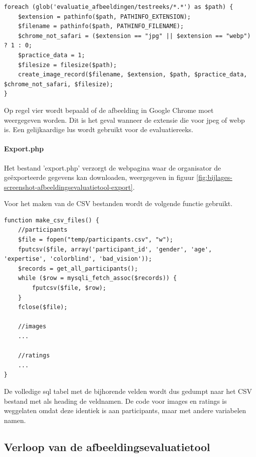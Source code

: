 \begin{lstlisting}
foreach (glob('evaluatie_afbeeldingen/testreeks/*.*') as $path) {
	$extension = pathinfo($path, PATHINFO_EXTENSION);
	$filename = pathinfo($path, PATHINFO_FILENAME);
	$chrome_not_safari = ($extension == "jpg" || $extension == "webp") ? 1 : 0;
	$practice_data = 1;
	$filesize = filesize($path);
	create_image_record($filename, $extension, $path, $practice_data, $chrome_not_safari, $filesize);
}
\end{lstlisting}

Op regel vier wordt bepaald of de afbeelding in Google Chrome moet weergegeven worden. Dit is het geval wanneer de \gls{extensie} die voor \gls{jpeg} of \gls{webp} is. Een gelijkaardige lus wordt gebruikt voor de evaluatiereeks. 

\paragraph{Export.php}
\label{sec:onderzoek-evaluatietool-setup-export}

Het bestand 'export.php' verzorgt de webpagina waar de organisator de geëxporteerde gegevens kan downloaden, weergegeven in figuur \ref{fig:bijlages-screenshot-afbeeldingsevaluatietool-export}.  

Voor het maken van de CSV bestanden wordt de volgende functie gebruikt.

\begin{lstlisting}
function make_csv_files() {
	//participants
	$file = fopen("temp/participants.csv", "w");
	fputcsv($file, array('participant_id', 'gender', 'age', 'expertise', 'colorblind', 'bad_vision'));
	$records = get_all_participants();
	while ($row = mysqli_fetch_assoc($records)) {
		fputcsv($file, $row);
	}
	fclose($file);
	
	//images
	...
	
	//ratings
	...
}
\end{lstlisting}

De volledige \gls{sql} tabel met de bijhorende velden wordt dus gedumpt naar het CSV bestand met als heading de veldnamen. De code voor images en ratings is weggelaten omdat deze identiek is aan participants, maar met andere variabelen namen.

\subsection{Verloop  van de afbeeldingsevaluatietool}
\label{sec:onderzoek-evaluatietool-verloop}

